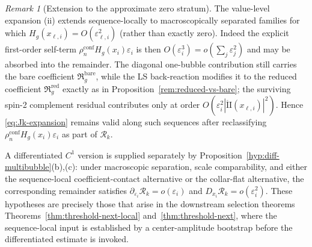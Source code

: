\documentclass[11pt,reqno,a4paper]{amsart}
\numberwithin{equation}{section}
\theoremstyle{plain}
\theoremstyle{remark}
\newtheorem{remark}[theorem]{Remark}
\theoremstyle{plain}
\begin{document}
\begin{remark}[Extension to the approximate zero stratum]\label{rem:approx-zero-stratum}
The value-level expansion \textup{(ii)} extends sequence-locally to macroscopically separated families for which
$H_g(x_{\ell,i})=O(\varepsilon_{\ell,i}^2)$ (rather than exactly zero). Indeed the explicit first-order self-term
$\rho_n^{\mathrm{conf}}H_g(x_i)\varepsilon_i$ is then $O(\varepsilon_i^3)=o(\sum_j\varepsilon_j^2)$ and may be absorbed
into the remainder. The diagonal one-bubble contribution still carries the bare coefficient
$\mathfrak R_g^{\mathrm{bare}}$, while the LS back-reaction modifies it to the reduced coefficient
$\mathfrak R_g^{\mathrm{red}}$ exactly as in Proposition~\ref{rem:reduced-vs-bare}; the surviving spin-2 complement
residual contributes only at order $O(\varepsilon_i^2|\mathring{\mathrm{II}}(x_{\ell,i})|^2)$. Hence
\eqref{eq:Jk-expansion} remains valid along such sequences after reclassifying
$\rho_n^{\mathrm{conf}}H_g(x_i)\varepsilon_i$ as part of $\mathcal R_k$.

A differentiated $C^1$ version is supplied separately by
Proposition~\ref{hyp:diff-multibubble}\textup{(b),(c)}: under macroscopic separation, scale comparability,
and either the sequence-local coefficient-contact alternative or the collar-flat alternative, the corresponding
remainder satisfies $\partial_{\varepsilon_i}\mathcal R_k=o(\varepsilon_i)$ and
$D_{x_i}\mathcal R_k=o(\varepsilon_i^2)$.  These hypotheses are precisely those that arise in the
downstream selection theorems Theorems~\ref{thm:threshold-next-local} and~\ref{thm:threshold-next}, where
the sequence-local input is established by a center-amplitude bootstrap before the differentiated estimate
is invoked.
\end{remark}
\end{document}
